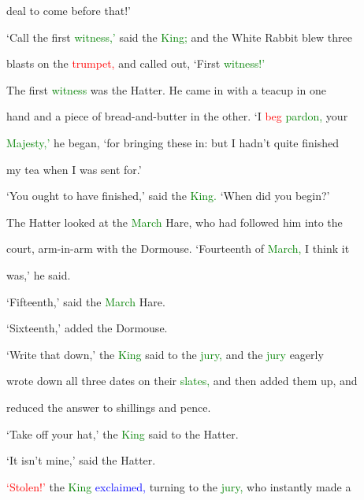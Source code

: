  \textcolor{BurntOrange}{deal} to come before that!’



 ‘Call the first \textcolor{green}{witness,’} said the \textcolor{green}{King;} and the \textcolor{BurntOrange}{White} Rabbit blew three

 \textcolor{BurntOrange}{blasts} on the \textcolor{red}{trumpet,} and called out, ‘First \textcolor{green}{witness!’}



 The first \textcolor{green}{witness} was the Hatter. He came in with a teacup in one

 hand and a piece of bread-and-butter in the other. ‘I \textcolor{red}{beg} \textcolor{green}{pardon,} your

 \textcolor{green}{Majesty,’} he began, ‘for bringing these in: but I hadn’t quite finished

 my tea when I was sent for.’



 ‘You ought to have finished,’ said the \textcolor{green}{King.} ‘When did you begin?’



 The Hatter looked at the \textcolor{green}{March} Hare, who had followed him into the

 \textcolor{BurntOrange}{court,} arm-in-arm with the Dormouse. ‘Fourteenth of \textcolor{green}{March,} I think it

 was,’ he said.



 ‘Fifteenth,’ said the \textcolor{green}{March} Hare.



 ‘Sixteenth,’ added the Dormouse.



 ‘Write that down,’ the \textcolor{green}{King} said to the \textcolor{green}{jury,} and the \textcolor{green}{jury} eagerly

 wrote down all three dates on their \textcolor{green}{slates,} and then added them up, and

 reduced the answer to shillings and pence.



 ‘Take off your hat,’ the \textcolor{green}{King} said to the Hatter.



 ‘It isn’t mine,’ said the Hatter.



 \textcolor{red}{‘Stolen!’} the \textcolor{green}{King} \textcolor{blue}{exclaimed,} turning to the \textcolor{green}{jury,} who instantly made a

